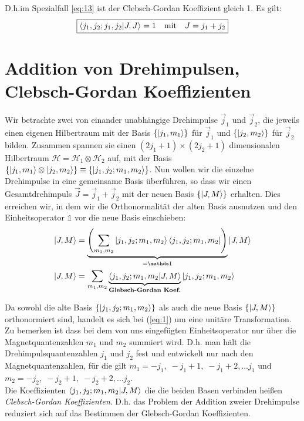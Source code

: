D.h.im Spezialfall \eqref{eq:13} ist der Clebsch-Gordan Koeffizient gleich 1. Es
gilt:
\begin{equation}
  \label{eq:18}
  \boxed{\braket{j_1,j_2;j_1,j_2}{J,J}=1 \quad \text{mit}\quad J=j_1+j_2}
\end{equation}

\section*{Addition von Drehimpulsen,\\
  Clebsch-Gordan Koeffizienten}
\label{sec:addit-von-dreh}

Wir betrachte zwei von einander unabhängige Drehimpulse \(\vec j_1\) und \(\vec
j_2\), die jeweils einen eigenen Hilbertraum mit der Basis \(\{\left| j_1,m_1 \right\rangle\}\)
für \(\vec j_1\) und \(\{\left| j_2,m_2 \right\rangle\}\) für \(\vec j_2\) bilden. Zusammen
spannen sie einen \((2j_1+1) \times (2j_2+1)\) dimensionalen Hilbertraum
\(\mathcal H = \mathcal H_1 \otimes \mathcal H_2\) auf, mit der Basis
\(\{\left| j_1,m_1 \right\rangle \otimes \left| j_2,m_2 \right\rangle\} \equiv \{\left| j_1,j_2;m_1,m_2 \right\rangle\}\).
Nun wollen wir die einzelne Drehimpulse in eine gemeinsame Basis überführen, so
dass wir einen Gesamtdrehimpuls \(\vec J=\vec j_1+\vec j_2\) mit der neuen Basis
\(\{\left| J,M \right\rangle\}\) erhalten. Dies erreichen wir, in dem wir die Orthonormalität
der alten Basis ausnutzen und den Einheitsoperator \(\mathds 1\) vor die neue
Basis einschieben:
\begin{align}
  \label{eq:1}
  \ket{J,M}&=\underbrace{\left(
      \sum_{m_1,m_2}\ket{j_1,j_2;m_1,m_2}\bra{j_1,j_2;m_1,m_2}
    \right)}_{= \mathds 1}
  \ket{J,M}\notag\\
   \ket{J,M}&= \sum_{m_1,m_2} 
   \underbrace{\braket{j_1,j_2;m_1,m_2}{J,M}}_
   {\text{\textbf{Glebsch-Gordan Koef.}}}
   \ket{j_1,j_2;m_1,m_2}
\end{align}

Da sowohl die alte Basis \( \{\left| j_1,j_2;m_1,m_2 \right\rangle\}\) als auch die neue Basis
\(\{\left| J,M \right\rangle\}\) orthonormiert sind, handelt es sich bei (\ref{eq:1}) um eine
unitäre Transformation. Zu bemerken ist dass bei dem von uns eingefügten
Einheitsoperator nur über die Magnetquantenzahlen \(m_1\) und \(m_2\) summiert
wird. D.h. man hält die Drehimpulsquantenzahlen \(j_1\) und \(j_2\) fest und
entwickelt nur nach den Magnetquantenzahlen, für die gilt \(m_1 = -j_1,\; -j_1+1,
\;-j_1+2, \dots j_1\) und \(m_2 = -j_2, \;-j_2+1,\;-j_2+2, \dots j_2\).\\
Die Koeffizienten \( \braket{j_1,j_2;m_1,m_2}{J,M} \) die die beiden Basen verbinden
heißen \emph{Clebsch-Gordan Koeffizienten}. D.h. das Problem der Addition zweier
Drehimpulse reduziert sich auf das Bestimmen der Glebsch-Gordan Koeffizienten.

